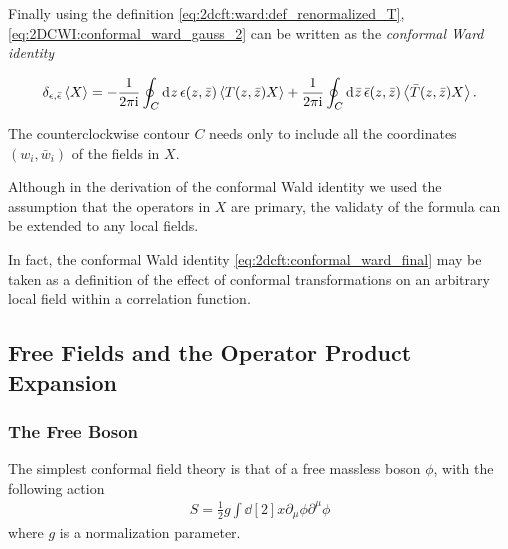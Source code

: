 \documentclass[10pt]{article}
\newcommand{\ii}{\mathrm{i}}
\newenvironment{boxmath}[1]{\begin{tcolorbox}[enhanced,attach boxed title to top center={yshift=-\tcboxedtitleheight/2},boxrule=1pt,title={\centering #1},colframe=NavyBlue!70!black,colback=NavyBlue!10,colbacktitle=NavyBlue!10,fonttitle=\scshape,coltitle=Black]}{\end{tcolorbox}}
\begin{document}
Finally using the definition \cref{eq:2dcft:ward:def_renormalized_T}, \cref{eq:2DCWI:conformal_ward_gauss_2} can be written as the \textit{conformal Ward identity}
\begin{boxmath}{Conformal Ward Identity}
    \begin{align}
        \delta_{\epsilon,\bar{\epsilon}}\expval{X}=-\frac{1}{2\pi\ii}\oint_C\dd[]{z}\epsilon(z,\bar{z})\expval{T(z,\bar{z})X}+\frac{1}{2\pi\ii}\oint_C\dd[]{\bar{z}}\bar{\epsilon}(z,\bar{z})\expval{\bar{T}(z,\bar{z})X}.\label{eq:2dcft:conformal_ward_final}
    \end{align}
\end{boxmath}
The counterclockwise contour $C$ needs only to include all the coordinates $(w_i,\bar{w}_i)$ of the fields in $X$.
\begin{remark}
    Although in the derivation of the conformal Wald identity we used the assumption that the operators in $X$ are primary, the validaty of the formula can be extended to any local fields.
    
    In fact, the conformal Wald identity \cref{eq:2dcft:conformal_ward_final} may be taken as a definition of the effect of conformal transformations on an arbitrary local field within a correlation function\snm.
\end{remark}

\subsection{Free Fields and the Operator Product Expansion}
\subsubsection{The Free Boson\label{subsubsec:2dcft:FFOPE:boson}}
The simplest conformal field theory is that of a free massless boson $\phi$, with the following action
\begin{align}
    S=\frac{1}{2}g\int\dd[2]{x}\partial_\mu\phi\partial^\mu\phi
\end{align}
where $g$ is a normalization parameter.
\end{document}
